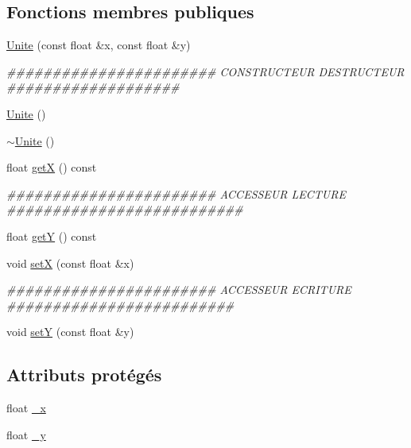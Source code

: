 \subsection*{Fonctions membres publiques}
\begin{DoxyCompactItemize}
\item 
\hyperlink{classUnite_a219ab47ae61b0e548231403f7514722c}{Unite} (const float \&x, const float \&y)
\begin{DoxyCompactList}\small\item\em \#\#\#\#\#\#\#\#\#\#\#\#\#\#\#\#\#\#\#\#\#\#\# CONSTRUCTEUR DESTRUCTEUR \#\#\#\#\#\#\#\#\#\#\#\#\#\#\#\#\#\#\# \end{DoxyCompactList}\item 
\hyperlink{classUnite_a4fed2aa808630902de024d0a2f29887c}{Unite} ()
\item 
\hyperlink{classUnite_ad8465e00f082a58d3be3a039eba46a53}{$\sim$Unite} ()
\item 
float \hyperlink{classUnite_accb774b72552d06c49d05f1d1051aa8e}{getX} () const 
\begin{DoxyCompactList}\small\item\em \#\#\#\#\#\#\#\#\#\#\#\#\#\#\#\#\#\#\#\#\#\#\# ACCESSEUR LECTURE \#\#\#\#\#\#\#\#\#\#\#\#\#\#\#\#\#\#\#\#\#\#\#\#\#\# \end{DoxyCompactList}\item 
float \hyperlink{classUnite_a148c8bfff24d9f38a1b453b0ab2807b0}{getY} () const 
\item 
void \hyperlink{classUnite_a2071b179dab8f59f00e3d92ac8d98108}{setX} (const float \&x)
\begin{DoxyCompactList}\small\item\em \#\#\#\#\#\#\#\#\#\#\#\#\#\#\#\#\#\#\#\#\#\#\# ACCESSEUR ECRITURE \#\#\#\#\#\#\#\#\#\#\#\#\#\#\#\#\#\#\#\#\#\#\#\#\# \end{DoxyCompactList}\item 
void \hyperlink{classUnite_af2bcfb3dd8a479ebb3809e4286de4f99}{setY} (const float \&y)
\end{DoxyCompactItemize}
\subsection*{Attributs protégés}
\begin{DoxyCompactItemize}
\item 
float \hyperlink{classUnite_a449ec3135e28a9d6ee324c144fb7e1f1}{\_\-x}
\item 
float \hyperlink{classUnite_a5e1320629b643182a6f416a180a357b5}{\_\-y}
\end{DoxyCompactItemize}


